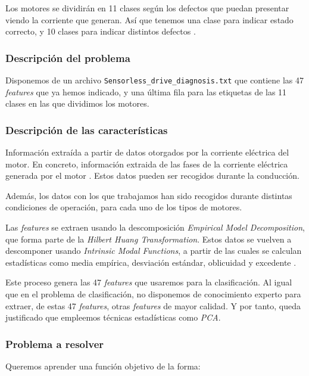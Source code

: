 \documentclass[11pt]{article}
\begin{document}
Los motores se dividirán en 11 clases según los defectos que puedan presentar viendo la corriente que generan. Así que tenemos una clase para indicar estado correcto, y 10 clases para indicar distintos defectos \cite{paper_clasificacion_1:paper}.

\subsubsection{Descripción del problema}

Disponemos de un archivo \lstinline{Sensorless_drive_diagnosis.txt} que contiene las 47 \emph{features} que ya hemos indicado, y una última fila para las etiquetas de las 11 clases en las que dividimos los motores.


\subsubsection{Descripción de las características}

Información extraída a partir de datos otorgados por la corriente eléctrica del motor. En concreto, información extraida de las fases de la corriente eléctrica generada por el motor \cite{paper_clasificacion_1:paper}. Estos datos pueden ser recogidos durante la conducción.

Además, los datos con los que trabajamos han sido recogidos durante distintas condiciones de operación, para cada uno de los tipos de motores.

Las \emph{features} se extraen usando la descomposición \emph{Empirical Model Decomposition}, que forma parte de la \emph{Hilbert Huang Transformation}. Estos datos se vuelven a descomponer usando \emph{Intrinsic Modal Functions}, a partir de las cuales se calculan estadísticas como media empírica, desviación estándar, oblicuidad y excedente \cite{paper_clasificacion_1:paper}.

Este proceso genera las 47 \emph{features} que usaremos para la clasificación. Al igual que en el problema de clasificación, no disponemos de conocimiento experto para extraer, de estas 47 \emph{features}, otras \emph{features} de mayor calidad. Y por tanto, queda justificado que empleemos técnicas estadísticas como \emph{PCA}.

\subsubsection{Problema a resolver}

Queremos aprender una función objetivo de la forma:
\end{document}
